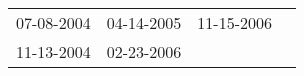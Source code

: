\begin{supertabular}{llll}
 07-08-2004 &  04-14-2005 &  11-15-2006 \\
 11-13-2004 &  02-23-2006 &             \\
\end{supertabular}
